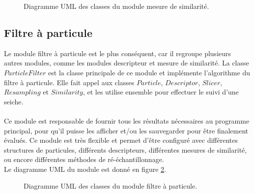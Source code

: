 \begin{figure}[!htbp]
\center
\caption{Diagramme UML des classes du module mesure de similarité.}
\label{fig:uml_diagram_similarity}
\end{figure}
\FloatBarrier




\subsection{Filtre à particule}
Le module filtre à particule est le plus conséquent, car il regroupe plusieurs autres modules, comme les modules descripteur et mesure de similarité. La classe $ParticleFilter$ est la classe principale de ce module et implémente l'algorithme du filtre à particule. Elle fait appel aux classes $Particle$, $Descriptor$, $Slicer$, $Resampling$ et $Similarity$, et les utilise ensemble pour effectuer le suivi d'une seiche.\\
\\
Ce module est responsable de fournir tous les résultats nécessaires au programme principal, pour qu'il puisse les afficher et/ou les sauvegarder pour être finalement évalués. Ce module est très flexible et permet d'être configuré avec différentes structures de particules, différents descripteurs, différentes mesures de similarité, ou encore différentes méthodes de ré-échantillonnage.\\
Le diagramme UML du module est donné en figure \ref{fig:uml_diagram_particlefilter}.

\begin{figure}[!htbp]
\center
\caption{Diagramme UML des classes du module filtre à particule.}
\label{fig:uml_diagram_particlefilter}
\end{figure}
\FloatBarrier





